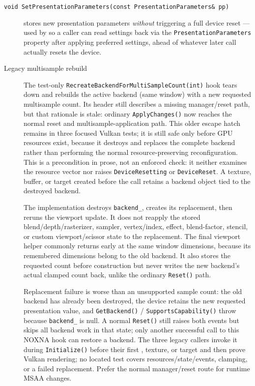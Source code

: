 \begin{description}
\item[\texttt{void SetPresentationParameters(const PresentationParameters\& pp)}] stores new
  presentation parameters \emph{without} triggering a full device reset --- used by
   so a caller can read settings back via the
  \texttt{PresentationParameters} property after applying preferred settings, ahead of whatever
  later call actually resets the device.
\item[Legacy multisample rebuild] \leavevmode\par
  The test-only \texttt{RecreateBackendForMultiSampleCount(int)} hook tears down and rebuilds
  the active backend (same window) with a new requested multisample count.
  Its header still describes a missing manager/reset path, but that rationale is stale:
  ordinary \texttt{ApplyChanges()} now reaches the normal reset and multisample-application
  path. This older escape hatch remains in three focused Vulkan tests; it is still safe only
  before GPU resources exist, because it destroys and replaces the complete backend rather than
  performing the normal resource-preserving reconfiguration. This is a precondition in prose,
  not an enforced check: it neither examines the resource vector nor raises \texttt{DeviceResetting}
  or \texttt{DeviceReset}. A texture, buffer, or target created before the call retains a
  backend object tied to the destroyed backend.

  The implementation destroys \texttt{backend\_}, creates its replacement, then reruns the
  viewport update. It does not reapply the stored blend/depth/rasterizer,
  sampler, vertex/index, effect, blend-factor, stencil, or custom viewport/scissor state to the
  replacement. The final viewport helper commonly returns early at the same window dimensions,
  because its remembered dimensions belong to the old backend. It also stores the requested count
  before construction but never writes the new backend's actual clamped count back, unlike the
  ordinary \texttt{Reset()} path.

  Replacement failure is worse than an unsupported sample count: the old backend has already
  been destroyed, the device retains the new requested presentation value, and
  \texttt{GetBackend()} / \texttt{SupportsCapability()} throw because \texttt{backend\_} is null.
  A normal \texttt{Reset()} still raises both events but skips all backend work in that state; only
  another successful call to this NOXNA hook can restore a backend. The three legacy callers invoke it
  during \texttt{Initialize()} before their first , texture, or target and
  then prove Vulkan rendering; no located test covers resources/state/events, clamping, or a
  failed replacement. Prefer the normal manager/reset route for runtime MSAA changes.
\end{description}

